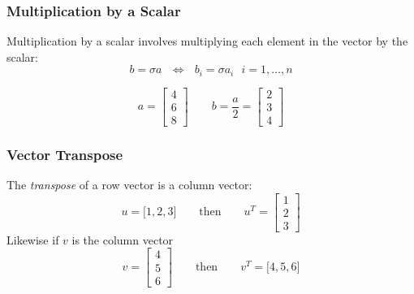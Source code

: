 \documentclass[10pt]{beamer}
\begin{document}
\begin{frame}
\frametitle{Multiplication by a Scalar}

Multiplication by a scalar involves multiplying each element
in the vector by the scalar:
\begin{equation*}
    b = \sigma a\ \ \ \Longleftrightarrow\ \ \  b_i = \sigma a_i\ \ \ i = 1,\ldots,n
\end{equation*}

\begin{equation*}
    a = \begin{bmatrix} 4 \\ 6 \\ 8 \end{bmatrix}
    \qquad
    b = \frac{a}{2} = \begin{bmatrix} 2 \\ 3  \\ 4 \end{bmatrix}
\end{equation*}


\end{frame}
\begin{frame}
\frametitle{Vector Transpose}

The \emph{transpose} of a row vector is a column vector:
\begin{equation*}
    u = \bigl[1, 2, 3\bigr]
    \qquad
    \text{then}
    \qquad
    u^T = \begin{bmatrix}1 \\ 2 \\ 3\end{bmatrix}
\end{equation*}
Likewise if $v$ is the column vector
\begin{equation*}
    v = \begin{bmatrix}4 \\ 5 \\ 6\end{bmatrix}
    \qquad
    \text{then}
    \qquad
    v^T = \bigl[4, 5, 6\bigr]
\end{equation*}


\end{frame}
\end{document}
